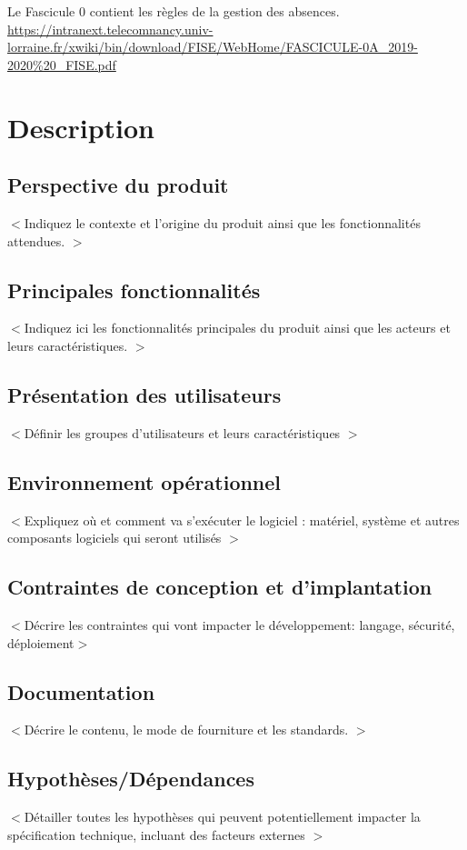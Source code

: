 \documentclass{scrreprt}
\begin{document}
Le Fascicule 0 contient les règles de la gestion des absences.
\url{https://intranext.telecomnancy.univ-lorraine.fr/xwiki/bin/download/FISE/WebHome/FASCICULE-0A_2019-2020\%20_FISE.pdf}

\chapter{Description}
\section{Perspective du produit}
$<$Indiquez le contexte et l'origine du produit ainsi que les fonctionnalités attendues. $>$

\section{Principales fonctionnalités}
$<$Indiquez ici les fonctionnalités principales du produit ainsi que les acteurs et leurs caractéristiques. $>$

\section{Présentation des utilisateurs}
$<$Définir les groupes d'utilisateurs et leurs caractéristiques $>$

\section{Environnement opérationnel}
$<$Expliquez où et comment va s'exécuter le logiciel : matériel, système et autres composants logiciels qui seront utilisés $>$

\section{Contraintes de conception et d'implantation}
$<$Décrire les contraintes qui vont impacter le développement: langage, sécurité, déploiement$>$

\section{Documentation}
$<$Décrire le contenu, le mode de fourniture et les standards. $>$

\section{Hypothèses/Dépendances}
$<$Détailler toutes les hypothèses qui peuvent potentiellement impacter la spécification technique, incluant des facteurs externes $>$
\end{document}
